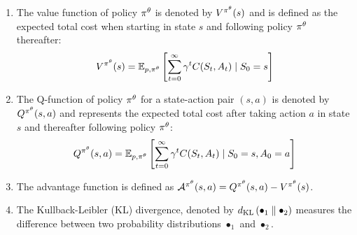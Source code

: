 \documentclass[12pt,twoside]{../../mitthesis}
\begin{document}
\begin{enumerate}
    \item The value function of policy $\policy^{\theta}$ is denoted by $V^{\policy^{\theta}}(s)$ and is defined as the expected total cost when starting in state $s$ and following policy $\policy^{\theta}$ thereafter:
    $$
    \Value^{\policy^{\theta}}(s) =  \E[\transit, \policy^{\theta}]{\sum_{t = 0}^{\infty} \gamma ^ t \Cost(\State_{t}, \Action_{t}) \mid \State_0 = \state}
    $$ 
    \item The Q-function of policy $\policy^{\theta}$ for a state-action pair $(s, a)$ is denoted by $Q^{\policy^{\theta}}(s, a)$ and represents the expected total cost after taking action $a$ in state $s$ and thereafter following policy $\policy^{\theta}$: 
    $$
    Q^{\policy^{\theta}}(s, a) = \E[\transit, \policy^{\theta}]{\sum_{t = 0}^{\infty} \gamma ^ t \Cost(\State_{t}, \Action_{t}) \mid \State_0 = \state, \Action_0 = \action}
    $$
    \item The advantage function is defined as $\Advan^{\policy^{\theta}}(s, a) = Q^{\policy^{\theta}}(s, a) - \Value^{\policy^{\theta}}(s)$.
    \item The Kullback-Leibler (KL) divergence, denoted by $\kldiv{\bullet_1}{\bullet_2}$ measures the difference between two probability distributions $\bullet_1$ and $\bullet_2$.
\end{enumerate}
\end{document}
